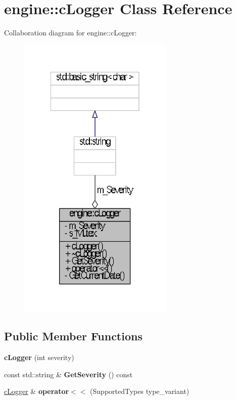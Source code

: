 \hypertarget{classengine_1_1cLogger}{\section{engine\-:\-:c\-Logger \-Class \-Reference}
\label{classengine_1_1cLogger}
}


\-Collaboration diagram for engine\-:\-:c\-Logger\-:\nopagebreak
\begin{figure}[H]
\begin{center}
\leavevmode
\includegraphics[width=210pt]{classengine_1_1cLogger__coll__graph}
\end{center}
\end{figure}
\subsection*{\-Public \-Member \-Functions}
\begin{DoxyCompactItemize}
\item 
\hypertarget{classengine_1_1cLogger_a127edc3f43400830cc8b46a1ccd5d183}{{\bfseries c\-Logger} (int severity)}\label{classengine_1_1cLogger_a127edc3f43400830cc8b46a1ccd5d183}

\item 
\hypertarget{classengine_1_1cLogger_a1473c1a79b0e677476da12f457fd8ff6}{const std\-::string \& {\bfseries \-Get\-Severity} () const }\label{classengine_1_1cLogger_a1473c1a79b0e677476da12f457fd8ff6}

\item 
\hypertarget{classengine_1_1cLogger_afaad3dca17bb3dd399d379e2ddd114b2}{\hyperlink{classengine_1_1cLogger}{c\-Logger} \& {\bfseries operator$<$$<$} (\-Supported\-Types type\-\_\-variant)}\label{classengine_1_1cLogger_afaad3dca17bb3dd399d379e2ddd114b2}

\end{DoxyCompactItemize}

